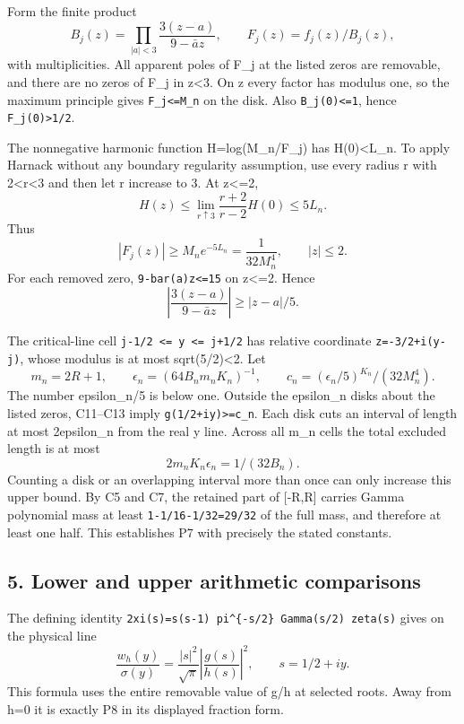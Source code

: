 \documentclass[11pt]{article}
\begin{document}
Form the finite product \[
B_j(z)=\prod_{|a|<3}\frac{3(z-a)}{9-\bar a z},
\qquad F_j(z)=f_j(z)/B_j(z),
\] with multiplicities. All apparent poles of F\_j at the listed zeros are removable, and there are no zeros of F\_j in \textbar z\textbar\textless3. On \textbar z every factor has modulus one, so the maximum principle gives \texttt{\textbar{}F\_j\textbar{}\textless{}=M\_n} on the disk. Also \texttt{\textbar{}B\_j(0)\textbar{}\textless{}=1}, hence \texttt{\textbar{}F\_j(0)\textbar{}\textgreater{}1/2}.

The nonnegative harmonic function H=log(M\_n/\textbar F\_j\textbar) has H(0)\textless L\_n. To apply Harnack without any boundary regularity assumption, use every radius r with 2\textless r\textless3 and then let r increase to 3. At \textbar z\textbar\textless=2, \[
H(z)\le\lim_{r\uparrow3}\frac{r+2}{r-2}H(0)
 \le5L_n.
\] Thus \[
|F_j(z)|\ge M_ne^{-5L_n}=\frac1{32M_n^4},\qquad |z|\le2.
\tag{C12}
\] For each removed zero, \texttt{\textbar{}9-bar(a)z\textbar{}\textless{}=15} on \textbar z\textbar\textless=2. Hence \[
\left|\frac{3(z-a)}{9-\bar a z}\right|\ge|z-a|/5.
\tag{C13}
\]

The critical-line cell \texttt{j-1/2\ \textless{}=\ y\ \textless{}=\ j+1/2} has relative coordinate \texttt{z=-3/2+i(y-j)}, whose modulus is at most sqrt(5/2)\textless2. Let \[
m_n=2R+1,\qquad
\epsilon_n=(64B_nm_nK_n)^{-1},\qquad
c_n=(\epsilon_n/5)^{K_n}/(32M_n^4).
\] The number epsilon\_n/5 is below one. Outside the epsilon\_n disks about the listed zeros, C11--C13 imply \texttt{\textbar{}g(1/2+iy)\textbar{}\textgreater{}=c\_n}. Each disk cuts an interval of length at most 2epsilon\_n from the real y line. Across all m\_n cells the total excluded length is at most \[
2m_nK_n\epsilon_n=1/(32B_n).
\tag{C14}
\] Counting a disk or an overlapping interval more than once can only increase this upper bound. By C5 and C7, the retained part of {[}-R,R{]} carries Gamma polynomial mass at least \texttt{1-1/16-1/32=29/32} of the full mass, and therefore at least one half. This establishes P7 with precisely the stated constants.

\subsection{5. Lower and upper arithmetic comparisons}\label{lower-and-upper-arithmetic-comparisons}

The defining identity \texttt{2xi(s)=s(s-1)\ pi\^{}\{-s/2\}\ Gamma(s/2)\ zeta(s)} gives on the physical line \[
\frac{w_h(y)}{\sigma(y)}=
 \frac{|s|^2}{\sqrt\pi}\left|\frac{g(s)}{h(s)}\right|^2,
 \qquad s=1/2+iy.
\tag{C15}
\] This formula uses the entire removable value of g/h at selected roots. Away from h=0 it is exactly P8 in its displayed fraction form.
\end{document}
